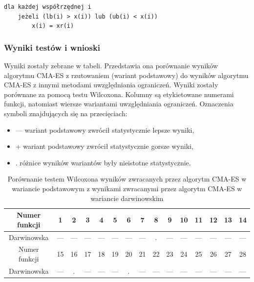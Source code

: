 \documentclass{mini}
\begin{document}
\begin{Verbatim}[baselinestretch=1.1]
dla każdej współrzędnej i
	jeżeli (lb(i) > x(i)) lub (ub(i) < x(i))
		x(i) = xr(i)
\end{Verbatim}

\subsubsection{Wyniki testów i wnioski}
\hspace{3,4ex}Wyniki zostały zebrane w tabeli. Przedstawia ona porównanie wyników algorytmu CMA-ES z rzutowaniem (wariant podstawowy) do wyników algorytmu CMA-ES z innymi metodami uwzględniania ograniczeń. Wyniki zostały porównane za pomocą testu Wilcoxona. Kolumny są etykietowane numerami funkcji, natomiast wiersze wariantami uwzględniania ograniczeń. Oznaczenia symboli znajdujących się na przecięciach:
\begin{itemize}[noitemsep]
\item --- wariant podstawowy zwrócił statystycznie lepsze wyniki,
\item + wariant podstawowy zwrócił statystycznie gorsze wyniki,
\item . różnice wyników wariantów były nieistotne statystycznie.
\end{itemize}

\begin{table}[H]
\begin{tabular}{|c|c|c|c|c|c|c|c|c|c|c|c|c|c|c|} \hline
Numer funkcji & 1 & 2 & 3 & 4 & 5 & 6 & 7 & 8 & 9 & 10 & 11 & 12 & 13 & 14 \\ \hline
Darwinowska & --- & --- & --- & --- & --- & --- & --- & . & --- & --- & --- & --- & --- & --- \\ \hline \hline
Numer funkcji & 15 & 16 & 17 & 18 & 19 & 20 & 21 & 22 & 23 & 24 & 25 & 26 & 27 & 28 \\ \hline
Darwinowska & --- & . & --- & --- & --- & . & --- & --- & --- & --- & --- & --- & --- & --- \\ \hline
\end{tabular}
\caption{Porównanie testem Wilcoxona wyników zwracanych przez algorytm CMA-ES w wariancie podstawowym z wynikami zwracanymi przez algorytm CMA-ES w wariancie darwinowskim}
\end{table}
\end{document}
